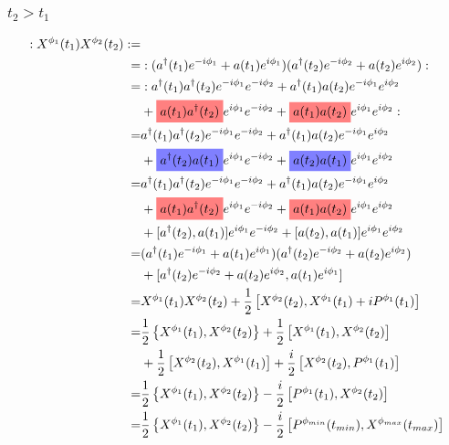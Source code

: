 \documentclass[12pt]{article}
\newcommand{\highlightr}[1]{%
  \colorbox{red!50}{$\displaystyle#1$}}
\newcommand{\highlightb}[1]{%
  \colorbox{blue!50}{$\displaystyle#1$}}
\begin{document}
\subsubsection{$t_2>t_1$}

\begin{align}
:X^{\phi_1}(t_1)X^{\phi_2}(t_2): =&\\
=& :(a^{\dag}(t_1)e^{-i\phi_1} + a(t_1)e^{i\phi_1})(a^{\dag}(t_2)e^{-i\phi_2} + a(t_2)e^{i\phi_2}):\\
=& :a^{\dag}(t_1)a^{\dag}(t_2)e^{-i\phi_1}e^{-i\phi_2} + a^{\dag}(t_1)a(t_2)e^{-i\phi_1}e^{i\phi_2}\\
&+ \highlightr{a(t_1)a^{\dag}(t_2)}e^{i\phi_1}e^{-i\phi_2} + \highlightr{a(t_1)a(t_2)}e^{i\phi_1}e^{i\phi_2}:\\
=& a^{\dag}(t_1)a^{\dag}(t_2)e^{-i\phi_1}e^{-i\phi_2} + a^{\dag}(t_1)a(t_2)e^{-i\phi_1}e^{i\phi_2}\\
&+ \highlightb{a^{\dag}(t_2)a(t_1)}e^{i\phi_1}e^{-i\phi_2} + \highlightb{a(t_2)a(t_1)}e^{i\phi_1}e^{i\phi_2}\\
=& a^{\dag}(t_1)a^{\dag}(t_2)e^{-i\phi_1}e^{-i\phi_2} + a^{\dag}(t_1)a(t_2)e^{-i\phi_1}e^{i\phi_2}\\
&+ \highlightr{a(t_1)a^{\dag}(t_2)}e^{i\phi_1}e^{-i\phi_2} + \highlightr{a(t_1)a(t_2)}e^{i\phi_1}e^{i\phi_2}\\
&+ [a^{\dag}(t_2), a(t_1)]e^{i\phi_1}e^{-i\phi_2} + [a(t_2), a(t_1)]e^{i\phi_1}e^{i\phi_2}\\
=& (a^{\dag}(t_1)e^{-i\phi_1} + a(t_1)e^{i\phi_1})(a^{\dag}(t_2)e^{-i\phi_2} + a(t_2)e^{i\phi_2})\\
&+ [a^{\dag}(t_2)e^{-i\phi_2} + a(t_2)e^{i\phi_2}, a(t_1)e^{i\phi_1}]\\
=& X^{\phi_1}(t_1)X^{\phi_2}(t_2) + \frac{1}{2}\left[X^{\phi_2}(t_2), X^{\phi_1}(t_1) + i P^{\phi_1}(t_1)\right]\\
=& \frac{1}{2}\left\{X^{\phi_1}(t_1), X^{\phi_2}(t_2)\right\} + \frac{1}{2}\left[X^{\phi_1}(t_1), X^{\phi_2}(t_2)\right]\\
&+ \frac{1}{2}\left[X^{\phi_2}(t_2), X^{\phi_1}(t_1)\right] + \frac{i}{2}\left[X^{\phi_2}(t_2), P^{\phi_1}(t_1)\right]\\
=& \frac{1}{2}\left\{X^{\phi_1}(t_1), X^{\phi_2}(t_2)\right\} - \frac{i}{2}\left[P^{\phi_1}(t_1), X^{\phi_2}(t_2)\right]\\
=& \frac{1}{2}\left\{X^{\phi_1}(t_1), X^{\phi_2}(t_2)\right\} - \frac{i}{2}\left[P^{\phi_{min}}(t_{min}), X^{\phi_{max}}(t_{max})\right]\\
\end{align}
\end{document}
